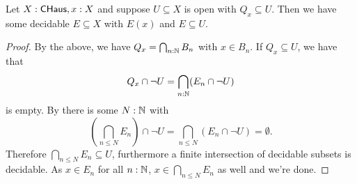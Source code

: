 \begin{lemma}\label{ConnectedComponentSubOpenHasDecidableInbetween}
  Let $X:\mathsf{CHaus}, x:X$ and suppose $U\subseteq X$ is open with $Q_x\subseteq U$. 
  Then we have some decidable $E\subseteq X$ with $E(x)$ and $E\subseteq U$. 
\end{lemma}
\begin{proof}
  By the above, we have $Q_x = \bigcap_{n:\mathbb{N}}B_n$ with $x\in B_n$. 
  If $Q_x \subseteq U$, we have that 
  $$Q_x\cap \neg U = \bigcap_{n:\mathbb{N}} (E_n \cap \neg U)$$ is empty. 
  By  there is some $N:\mathbb{N}$ with 
  $$(\bigcap_{n\leq N} E_n )\cap \neg U  = \bigcap_{n\leq N} (E_n \cap \neg U) = \emptyset.$$
  Therefore $\bigcap_{n\leq N} E_n \subseteq U$, furthermore a finite intersection of decidable subsets is decidable. 
  As $x\in E_n$ for all $n:\mathbb{N}$, $x\in \bigcap_{n\leq N} E_n$ as well and we're done. 
\end{proof}


%
%
